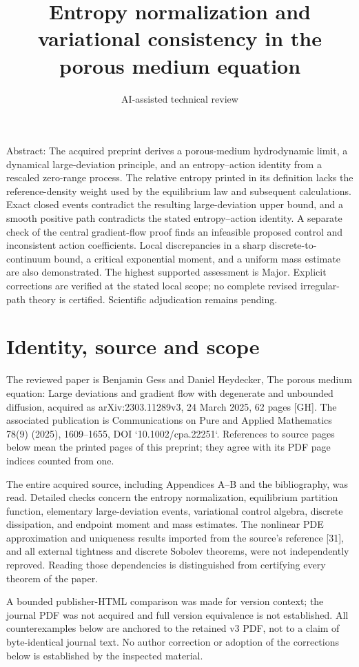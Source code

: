 \documentclass[10pt]{article}
\title{Entropy normalization and variational consistency
in the porous medium equation}
\author{AI-assisted technical review}
\date{}
\begin{document}
\maketitle
Abstract: The acquired preprint derives a porous-medium hydrodynamic limit, a dynamical large-deviation principle, and an entropy–action identity from a rescaled zero-range process. The relative entropy printed in its definition lacks the reference-density weight used by the equilibrium law and subsequent calculations. Exact closed events contradict the resulting large-deviation upper bound, and a smooth positive path contradicts the stated entropy–action identity. A separate check of the central gradient-flow proof finds an infeasible proposed control and inconsistent action coefficients. Local discrepancies in a sharp discrete-to-continuum bound, a critical exponential moment, and a uniform mass estimate are also demonstrated. The highest supported assessment is Major. Explicit corrections are verified at the stated local scope; no complete revised irregular-path theory is certified. Scientific adjudication remains pending.\par
\section*{Identity, source and scope}
The reviewed paper is Benjamin Gess and Daniel Heydecker, The porous medium equation: Large deviations and gradient flow with degenerate and unbounded diffusion, acquired as arXiv:2303.11289v3, 24 March 2025, 62 pages [GH]. The associated publication is Communications on Pure and Applied Mathematics 78(9) (2025), 1609–1655, DOI `10.1002/cpa.22251`. References to source pages below mean the printed pages of this preprint; they agree with its PDF page indices counted from one.\par
The entire acquired source, including Appendices A–B and the bibliography, was read. Detailed checks concern the entropy normalization, equilibrium partition function, elementary large-deviation events, variational control algebra, discrete dissipation, and endpoint moment and mass estimates. The nonlinear PDE approximation and uniqueness results imported from the source’s reference [31], and all external tightness and discrete Sobolev theorems, were not independently reproved. Reading those dependencies is distinguished from certifying every theorem of the paper.\par
A bounded publisher-HTML comparison was made for version context; the journal PDF was not acquired and full version equivalence is not established. All counterexamples below are anchored to the retained v3 PDF, not to a claim of byte-identical journal text. No author correction or adoption of the corrections below is established by the inspected material.\par
\end{document}
